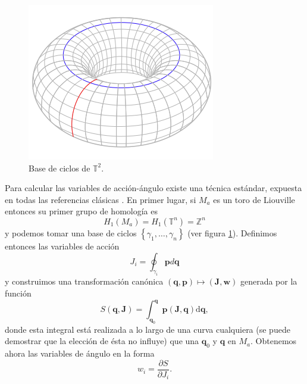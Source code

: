 \documentclass[11pt,a4paper,twoside]{article}
\theoremstyle{definition} \newtheorem{defn}[thm]{Definición}
\theoremstyle{definition} \newtheorem{ejemplo}[thm]{Ejemplo}
\theoremstyle{definition} \newtheorem{ejercicio}[thm]{Ejercicio}
\theoremstyle{remark} \newtheorem*{obs}{Observación}
\def\TT{\mathbb{T}}
\def\dd{\mathrm{d}}
\newcommand{\vect}[1]{\mathbf{#1}}
\begin{document}
       \begin{figure}[h]
	 \centering
	 \includegraphics[width=.3\textwidth]{homology}
	 \caption{\small Base de ciclos de $\TT^2$.}
	 \label{fig:toro}
       \end{figure}

       Para calcular las variables de acción-ángulo existe una técnica estándar, expuesta en todas las referencias clásicas \cite{arnold,goldstein,landau}. En primer lugar, si $M_a$ es un toro de Liouville entonces su primer grupo de homología es
       \begin{equation*}
	 H_1(M_a)=H_1(\mathbb{T} ^n)=\mathbb{Z} ^n
       \end{equation*}
       y podemos tomar una base de ciclos $\left\{ \gamma_1,\dots,\gamma_n \right\}$ (ver figura \ref{fig:toro}). Definimos entonces las variables de acción
       \begin{equation}
	 J_i=\oint_{\gamma_i} \vect{p} d \vect{q}
       \end{equation}
       y construimos una transformación canónica $(\vect{q},\vect{p})\mapsto (\vect{J},\vect{w})$ generada por la función
       \begin{equation}
	 S(\vect{q},\vect{J})=\int_{\vect{q}_0}^{\vect{q}}\vect{p}(\vect{J},\vect{q}) \dd \vect{q} ,	
       \end{equation}
       donde esta integral está realizada a lo largo de una curva cualquiera (se puede demostrar que la elección de ésta no influye) que una $\vect{q}_0$ y $\vect{q}$ en $M_a$. Obtenemos ahora las variables de ángulo en la forma
       \begin{equation}
	 w_i=\frac{\partial S}{\partial J_i}. 
       \end{equation}
\end{document}
